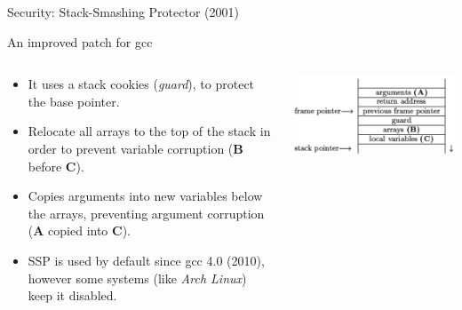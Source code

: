 \begin{frame}{Security: Stack-Smashing Protector (2001)}
	\begin{block}{An improved patch for gcc}
		\begin{columns}
			\begin{column}{.5\textwidth}
		\begin{itemize}
			\setlength{\leftmargini}{0pt}
			\item It uses a stack cookies (\emph{guard}), to protect the base pointer.
			\item Relocate all arrays to the top of the stack in order to prevent variable corruption (\textbf{B} before \textbf{C}).
			\item Copies arguments into new variables below the arrays, preventing argument corruption (\textbf{A} copied into \textbf{C}).
			\item SSP is used by default since gcc 4.0 (2010), however some systems (like \emph{Arch Linux}) keep it disabled.
		\end{itemize}
			\end{column}
			\begin{column}{.5\textwidth}
				\includegraphics[width=\textwidth]{imgs/sec-ssp.png}
			\end{column}
		\end{columns}
	\end{block}
\end{frame}


